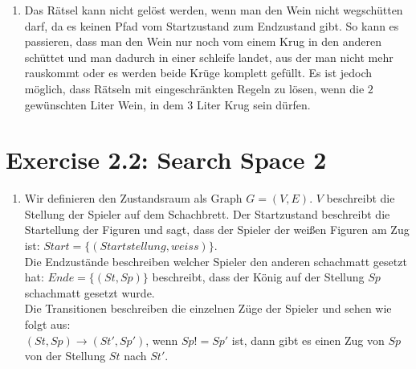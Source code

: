 \documentclass[a4paper]{scrartcl}
\def \blattnr {2}
\begin{document}
\begin{enumerate}
\begin{enumerate}[label=(\alph*)]
            \item
			Das Rätsel kann nicht gelöst werden, wenn man den Wein nicht wegschütten darf, da
			es keinen Pfad vom Startzustand zum Endzustand gibt. So kann es passieren, dass
			man den Wein nur noch vom einem Krug in den anderen schüttet und man dadurch in einer
			schleife landet, aus der man nicht mehr rauskommt oder es werden beide Krüge komplett
			gefüllt. Es ist jedoch möglich, dass Rätseln mit eingeschränkten Regeln zu lösen, wenn die $2$
			gewünschten Liter 
			Wein, in dem $3$ Liter Krug sein dürfen. \\

        \end{enumerate}

\end{enumerate}

\section*{Exercise \blattnr.2: Search Space 2}
\begin{enumerate}
	\item 
	Wir definieren den Zustandsraum als Graph $G = (V, E)$. $V$ beschreibt die Stellung der Spieler auf 
	dem Schachbrett. Der Startzustand beschreibt die Startellung der Figuren und sagt, dass der Spieler
	der weißen Figuren am Zug ist: $Start = \{(Startstellung, weiss)\}$. \\
	Die Endzustände beschreiben welcher Spieler den anderen schachmatt gesetzt hat: $Ende = \{(St, Sp)\}$ 
	beschreibt, dass der König auf der Stellung $Sp$ schachmatt gesetzt wurde. \\
	Die Transitionen beschreiben die einzelnen Züge der Spieler und sehen wie folgt aus: \\
	$(St, Sp) \rightarrow (St', Sp')$, wenn $Sp != Sp'$ ist, dann gibt es einen Zug von $Sp$ von der 
	Stellung $St$ nach $St'$. \\
	
\end{enumerate}
\end{document}
